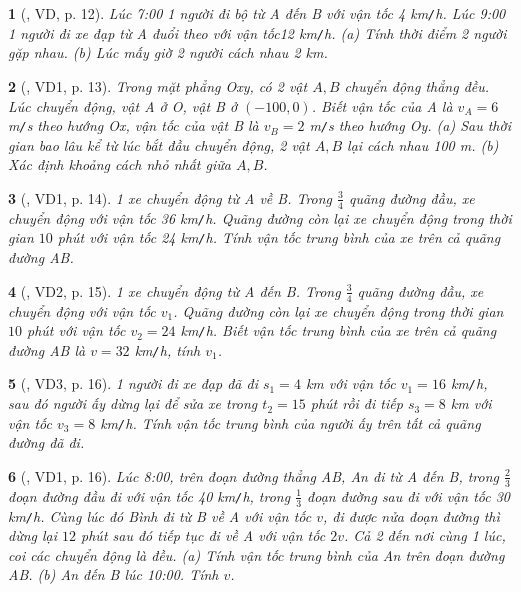 \documentclass{article}
\newtheorem{baitoan}{}
\begin{document}
\begin{baitoan}[\cite{Van_Quyen_Hanh_Nhu_10_chuyen_Ly}, VD, p. 12]
	Lúc {\rm7:00} 1 người đi bộ từ A đến B với vận tốc {\rm4 km{\tt/}h}. Lúc {\rm9:00} 1 người đi xe đạp từ A đuổi theo với vận tốc{\rm12 km{\tt/}h}. (a) Tính thời điểm 2 người gặp nhau. (b) Lúc mấy giờ 2 người cách nhau {\rm2 km}.
\end{baitoan}

\begin{baitoan}[\cite{Van_Quyen_Hanh_Nhu_10_chuyen_Ly}, VD1, p. 13]
	Trong mặt phẳng Oxy, có 2 vật $A,B$ chuyển động thẳng đều. Lúc chuyển động, vật A ở O, vật B ở $(-100,0)$. Biết vận tốc của A là $v_A = 6$ {\rm m{\tt/}s} theo hướng Ox, vận tốc của vật B là $v_B = 2$ {\rm m{\tt/}s} theo hướng Oy. (a) Sau thời gian bao lâu kể từ lúc bắt đầu chuyển động, 2 vật $A,B$ lại cách nhau {\rm100 m}. (b) Xác định khoảng cách nhỏ nhất giữa $A,B$.
\end{baitoan}

\begin{baitoan}[\cite{Van_Quyen_Hanh_Nhu_10_chuyen_Ly}, VD1, p. 14]
	1 xe chuyển động từ A về B. Trong $\frac{3}{4}$ quãng đường đầu, xe chuyển động với vận tốc {\rm36 km{\tt/}h}. Quãng đường còn lại xe chuyển động trong thời gian $10$ phút với vận tốc {\rm24 km{\tt/}h}. Tính vận tốc trung bình của xe trên cả quãng đường AB.
\end{baitoan}

\begin{baitoan}[\cite{Van_Quyen_Hanh_Nhu_10_chuyen_Ly}, VD2, p. 15]
	1 xe chuyển động từ A đến B. Trong $\frac{3}{4}$ quãng đường đầu, xe chuyển động với vận tốc $v_1$. Quãng đường còn lại xe chuyển động trong thời gian $10$ phút với vận tốc $v_2 = 24$ {\rm km{\tt/}h}. Biết vận tốc trung bình của xe trên cả quãng đường AB là $v = 32$ {\rm km{\tt/}h}, tính $v_1$.
\end{baitoan}

\begin{baitoan}[\cite{Van_Quyen_Hanh_Nhu_10_chuyen_Ly}, VD3, p. 16]
	1 người đi xe đạp đã đi $s_1 = 4$ {\rm km} với vận tốc $v_1 = 16$ {\rm km{\tt/}h}, sau đó người ấy dừng lại để sửa xe trong $t_2 = 15$ phút rồi đi tiếp $s_3 = 8$ {\rm km} với vận tốc $v_3 = 8$ {\rm km{\tt/}h}. Tính vận tốc trung bình của người ấy trên tất cả quãng đường đã đi.
\end{baitoan}

\begin{baitoan}[\cite{Van_Quyen_Hanh_Nhu_10_chuyen_Ly}, VD1, p. 16]
	Lúc {\rm8:00}, trên đoạn đường thẳng AB, An đi từ A đến B, trong $\frac{2}{3}$ đoạn đường đầu đi với vận tốc {\rm40 km{\tt/}h}, trong $\frac{1}{3}$ đoạn đường sau đi với vận tốc {\rm30 km{\tt/}h}. Cùng lúc đó Bình đi từ B về A với vận tốc $v$, đi được nửa đoạn đường thì dừng lại $12$ phút sau đó tiếp tục đi về A với vận tốc $2v$. Cả 2 đến nơi cùng 1 lúc, coi các chuyển động là đều. (a) Tính vận tốc trung bình của An trên đoạn đường AB. (b) An đến B lúc {\rm10:00}. Tính $v$.
\end{baitoan}
\end{document}
